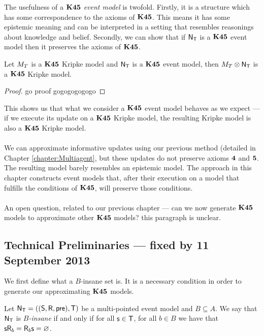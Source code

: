 The usefulness of a {\em $\bf K45$ event model} is twofold.
Firstly, it is a structure which has some correspondence to the axioms of $\bf K45$.
This means it has some epistemic meaning and can be interpreted in a setting that resembles
reasonings about knowledge and belief.
Secondly, we can show that if $\mathrm{\mathsf{N}}_\mathrm{\mathsf{T}}$ is a $\bf K45$ event model then it preserves the axioms of
$\bf K45$.

\begin{lemma} \label{lemma:k45preserved}
	Let $M_T$ is a $\bf K45$ Kripke model and $\mathrm{\mathsf{N}}_\mathrm{\mathsf{T}}$ is a $\bf K45$ event model, then
	$M_T \otimes \mathrm{\mathsf{N}}_\mathrm{\mathsf{T}}$ is a $\bf K45$ Kripke model.
\end{lemma}
\begin{proof}
	\FIXME go proof gogogogogogo
\end{proof}

This shows us that what we consider a $\bf K45$ event model behaves as we expect --- if we execute
its update on a $\bf K45$ Kripke model, the resulting Kripke model is also a $\bf K45$ Kripke model.\\
\\
We can approximate informative updates using our previous method (detailed in Chapter
\ref{chapter:Multiagent}, but these updates do not preserve
axioms $\bf 4$ and $\bf 5$.
The resulting model barely resembles an epistemic model.
The approach in this chapter constructs event models that, after their execution on a model that
fulfills the conditions of $\bf K45$, will preserve those conditions.\\
\\
An open question, related to our previous chapter --- can we now generate $\bf K45$ models to
approximate other $\bf K45$ models?
\FIXME this paragraph is unclear.

\subsection{Technical Preliminaries --- fixed by 11 September 2013}

We first define what a $B$-insane set is.
It is a necessary condition in order to generate our approximating $\bf K45$ models.

\begin{defn} \label{binsane}
	Let $\mathrm{\mathsf{N}}_\mathrm{\mathsf{T}} = ((\mathrm{\mathsf{S}}, \mathrm{\mathsf{R}}, \mathrm{\mathsf{pre}}), \mathrm{\mathsf{T}})$ be a multi-pointed event model and $B \subseteq A$.
	We say that $\mathrm{\mathsf{N}}_\mathrm{\mathsf{T}}$ is {\em $B$-insane} if and only if for all $\mathrm{\mathsf{s}} \in \mathrm{\mathsf{T}}$,
	for all $b \in B$ we have that $\mathrm{\mathsf{s}} \mathrm{\mathsf{R}}_b = \mathrm{\mathsf{R}}_b \mathrm{\mathsf{s}} = \varnothing$.
\end{defn}


